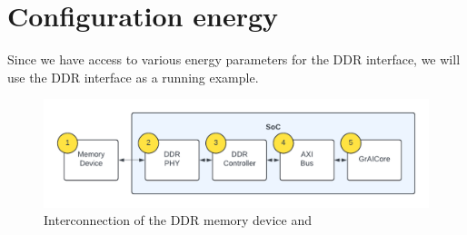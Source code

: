 \section{Configuration energy}
Since we have access to various energy parameters for the DDR interface, we will use the DDR interface as a running example.

\begin{figure}[hbtp]
    \centering
    \includegraphics[width=\linewidth]{assets/ddr_graicore_block_diagram.pdf}
    \caption{
        Interconnection of the DDR memory device and \graicore{}
    }
    \label{fig:ddr_graicore_block_diagram}
\end{figure}


